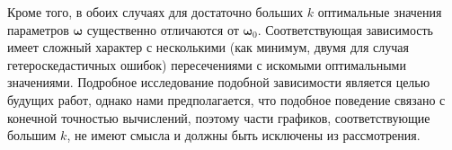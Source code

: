 \documentclass[11pt,a4paper]{article}
\begin{document}
Кроме того, в обоих случаях для достаточно больших $k$ оптимальные значения параметров $\boldsymbol{\omega}$
существенно отличаются от $\boldsymbol{\omega}_0$. Соответствующая зависимость имеет сложный
характер с несколькими (как минимум, двумя для случая гетероскедастичных ошибок) пересечениями
с искомыми оптимальными значениями.
Подробное исследование подобной зависимости является целью будущих работ, однако нами
предполагается, что подобное поведение связано с конечной точностью вычислений, поэтому части
графиков, соответствующие большим $k$, не имеют смысла и должны быть исключены из рассмотрения.

\end{document}

